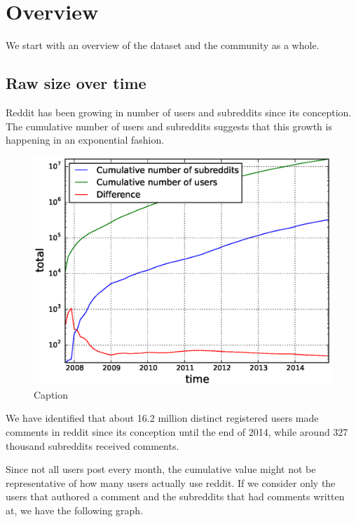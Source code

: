 \section{Overview}

We start with an overview of the dataset and the community as a whole.

\subsection{Raw size over time}

Reddit has been growing in number of users and subreddits since its conception. The cumulative number of users and subreddits suggests that this growth is happening in an exponential fashion.

\begin{figure}[!tb]
\centering
\includegraphics[scale=0.4]{./images/cumulative_users_subreddits.eps}
\caption{Caption}
\label{fig:cumulative_users_subreddits}
\end{figure}

We have identified that about 16.2 million distinct registered users made comments in reddit since its conception until the end of 2014, while around 327 thousand subreddits received comments. 

Since not all users post every month, the cumulative value might not be representative of how many users actually use reddit. If we consider only the users that authored a comment and the subreddits that had comments written at, we have the following graph.

